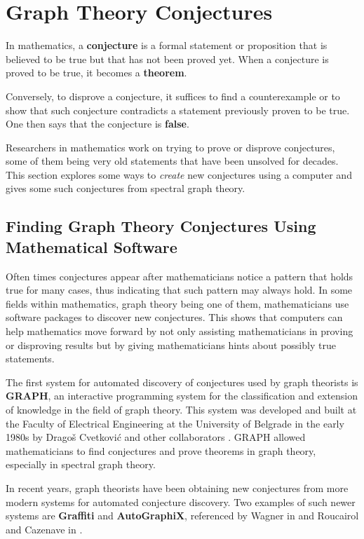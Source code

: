 \documentclass[11pt]{article}
\theoremstyle{definition}
\begin{document}
\newpage

\section{Graph Theory Conjectures} \label{conjectures}

In mathematics, a \textbf{conjecture} is a formal statement or proposition that is believed to be true but that has not been proved yet. When a conjecture is proved to be true, it becomes a \textbf{theorem}. 

Conversely, to disprove a conjecture, it suffices to find a counterexample or to show that such conjecture contradicts a statement previously proven to be true. One then says that the conjecture is \textbf{false}.

Researchers in mathematics work on trying to prove or disprove conjectures, some of them being very old statements that have been unsolved for decades. This section explores some ways to \textit{create} new conjectures using a computer and gives some such conjectures from spectral graph theory.

\subsection{Finding Graph Theory Conjectures Using Mathematical Software}

Often times conjectures appear after mathematicians notice a pattern that holds true for many cases, thus indicating that such pattern may always hold. In some fields within mathematics, graph theory being one of them, mathematicians use software packages to discover new conjectures. This shows that computers can help mathematics move forward by not only assisting mathematicians in proving or disproving results but by giving mathematicians hints about possibly true statements.

The first system for automated discovery of conjectures used by graph theorists is \textbf{GRAPH}, an interactive programming system for the classification and extension of knowledge in the field of graph theory. This system was developed and built at the Faculty of Electrical Engineering at the University of Belgrade in the early 1980s by Dragoš Cvetković and other collaborators \cite{zbMATH05689445}. GRAPH allowed mathematicians to find conjectures and prove theorems in graph theory, especially in spectral graph theory. 

In recent years, graph theorists have been obtaining new conjectures from more modern systems for automated conjecture discovery. Two examples of such newer systems are \textbf{Graffiti} and \textbf{AutoGraphiX}, referenced by Wagner in \cite{Wagner:2021} and Roucairol and Cazenave in \cite{RoucairolCazenave:2022}. 
\end{document}

